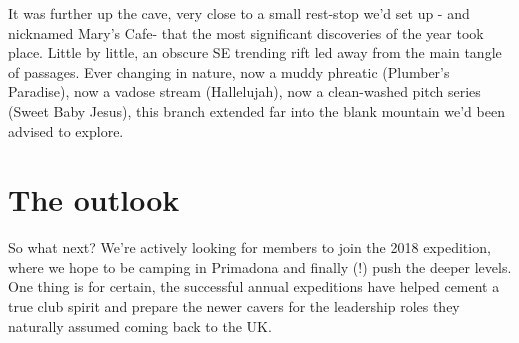 It was further up the cave, very close to a small rest-stop we’d set up - and nicknamed Mary’s Cafe- that the most significant discoveries of the year took place. Little by little, an obscure SE trending rift led away from the main tangle of passages. Ever changing in nature, now a muddy phreatic (Plumber’s Paradise), now a vadose stream (Hallelujah), now a clean-washed pitch series (Sweet Baby Jesus), this branch extended far into the blank mountain we’d been advised to explore.  

\section{The outlook}
So what next? We’re actively looking for members to join the 2018 expedition, where we hope to be camping in Primadona and finally (!) push the deeper levels. One thing is for certain, the successful annual expeditions have helped cement a true club spirit and prepare the newer cavers for the leadership roles they naturally assumed coming back to the UK. 

